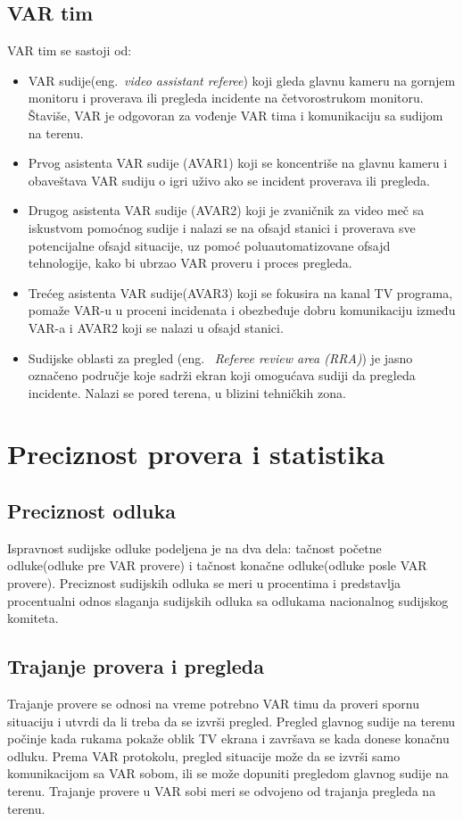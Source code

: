 \documentclass[a4paper]{article}
\begin{document}
\subsection{VAR tim}
VAR tim se sastoji od: 
\begin{itemize}
\item VAR sudije(eng.~{\em video assistant referee}) koji gleda glavnu kameru na gornjem monitoru i proverava ili pregleda incidente na četvorostrukom monitoru. Štaviše, VAR je odgovoran za vođenje VAR tima i komunikaciju sa sudijom na terenu.
\item Prvog asistenta VAR sudije (AVAR1) koji se koncentriše na glavnu kameru i obaveštava VAR sudiju o igri uživo ako se incident proverava ili pregleda.
\item Drugog asistenta VAR sudije (AVAR2) koji je zvaničnik za video meč sa iskustvom pomoćnog sudije i nalazi se na ofsajd stanici i proverava sve potencijalne ofsajd situacije, uz pomoć poluautomatizovane ofsajd tehnologije, kako bi ubrzao VAR proveru i proces pregleda.
\item Trećeg asistenta VAR sudije(AVAR3) koji se fokusira na kanal TV programa, pomaže VAR-u u proceni incidenata i obezbeđuje dobru komunikaciju između VAR-a i AVAR2 koji se nalazi u ofsajd stanici.
\item Sudijske oblasti za pregled (eng. ~{\em Referee review area (RRA)}) je jasno označeno područje koje sadrži ekran koji omogućava sudiji da pregleda incidente. Nalazi se pored terena, u blizini tehničkih zona.
\end{itemize}

\section{Preciznost provera i statistika} 
\subsection{Preciznost odluka} 
Ispravnost sudijske odluke podeljena je na dva dela: tačnost početne odluke(odluke pre VAR provere) i tačnost konačne odluke(odluke posle VAR provere). Preciznost sudijskih odluka se meri u procentima i predstavlja procentualni odnos slaganja sudijskih odluka sa odlukama nacionalnog sudijskog komiteta. 

\subsection{Trajanje provera i pregleda} 
Trajanje provere se odnosi na vreme potrebno VAR timu da proveri spornu situaciju i utvrdi da li treba da se izvrši pregled. Pregled glavnog sudije na terenu počinje kada rukama pokaže oblik TV ekrana i završava se kada donese konačnu odluku. Prema VAR protokolu, pregled situacije može da se izvrši samo komunikacijom sa VAR sobom, ili se može dopuniti pregledom glavnog sudije na terenu. Trajanje provere u VAR sobi meri se odvojeno od trajanja pregleda na terenu.
\end{document}
